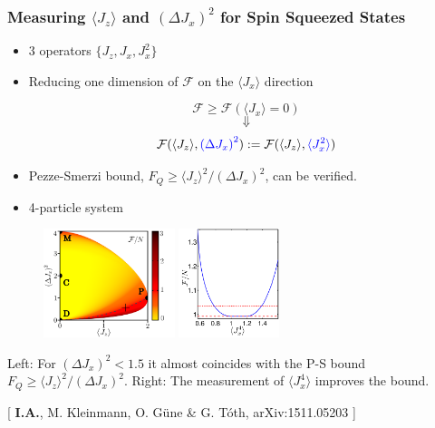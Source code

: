 \documentclass{beamer}
\newcommand{\expect}[1]{\ensuremath{\langle #1 \rangle}}
\newcommand{\varian}[1]{\ensuremath{\left(\Delta #1 \right)^2}}
\newcommand{\citate}[1]{{\footnotesize{\color{gray}[ #1 ]}}

	}
\begin{document}
		\begin{frame}

			\frametitle{Measuring $\expect{J_z}$ and $\varian{J_x}$ for Spin Squeezed States}

			\begin{itemize}
				\item<1-> 3 operators {\color{blue}$\{ J_z,J_x,J_x^2 \}$}
				\vspace{5px}
				\item<2-> Reducing one dimension of $\mathcal{F}$ on the $\expect{J_x}$ direction
				\begin{block}{}
					\[\mathcal{F} \geq \mathcal{F}(\expect{J_x}=0)\]
					\[\Downarrow\]
					\[\mathcal{F}(\expect{J_z},{\color{blue}\varian{J_x}}) := \mathcal{F}(\expect{J_z},{\color{blue}\expect{J_x^2}})
					\]
					\vspace{-12px}
				\end{block}
				\vspace{5px}
				\item<3-> Pezze-Smerzi bound, $F_Q\geq \expect{J_z}^2/\varian{J_x}$, can be verified.
			\end{itemize}

		\end{frame}

		\begin{frame}
			\begin{itemize}
				\item 4-particle system
			\end{itemize}
			\begin{figure}
				\includegraphics[height=120px]{img/lb-spsq.pdf}
				\hspace{15px}
				\includegraphics[height=120px]{img/4thparameter-spsq.pdf}
			\end{figure}
			{\color{blue} Left}: For $\varian{J_x}<1.5$ it almost coincides with the P-S bound $F_Q\geq \expect{J_z}^2/\varian{J_x}$. {\color{blue} Right}: The measurement of $\expect{J_x^4}$ improves the bound.

			\citate{\textbf{I.A.}, M. Kleinmann, O. G\"une \& G. T\'oth, arXiv:1511.05203}

		\end{frame}
\end{document}
